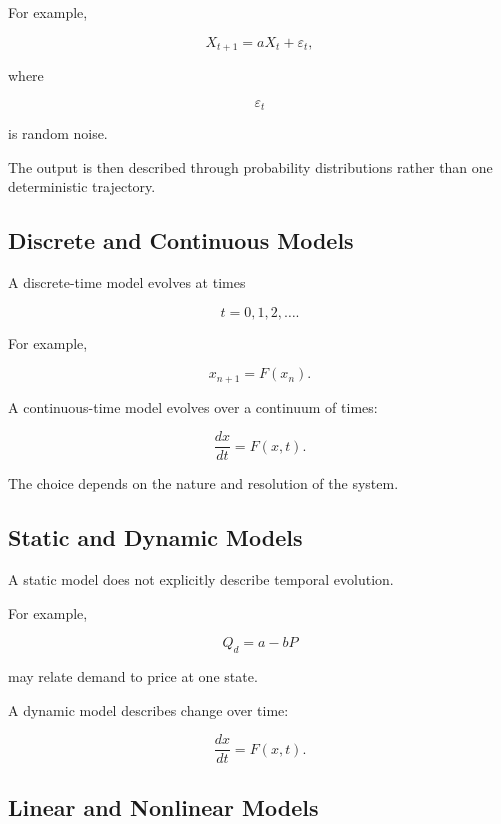 For example,

\[
\boxed{
X_{t+1}
=
aX_t+\varepsilon_t,
}
\]

where

\[
\varepsilon_t
\]

is random noise.

The output is then described through probability distributions rather than
one deterministic trajectory.

\subsection{Discrete and Continuous Models}
\label{subsec:discrete-continuous-models}

A discrete-time model evolves at times

\[
\boxed{
t=0,1,2,\ldots.
}
\]

For example,

\[
\boxed{
x_{n+1}=F(x_n).
}
\]

A continuous-time model evolves over a continuum of times:

\[
\boxed{
\frac{dx}{dt}=F(x,t).
}
\]

The choice depends on the nature and resolution of the system.

\subsection{Static and Dynamic Models}
\label{subsec:static-dynamic-models}

A static model does not explicitly describe temporal evolution.

For example,

\[
\boxed{
Q_d=a-bP
}
\]

may relate demand to price at one state.

A dynamic model describes change over time:

\[
\boxed{
\frac{dx}{dt}=F(x,t).
}
\]

\subsection{Linear and Nonlinear Models}
\label{subsec:linear-nonlinear-models}

